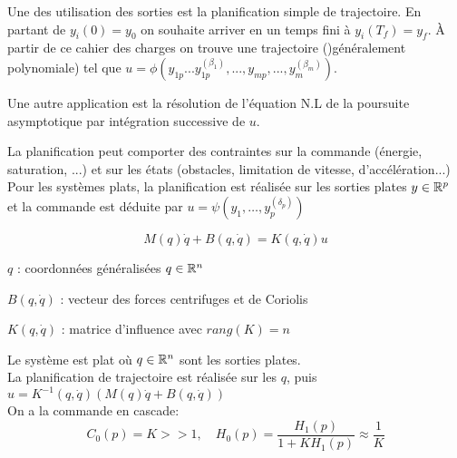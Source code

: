 \documentclass[main.tex]{subfiles}
\begin{document}
Une des utilisation des sorties est la planification simple de trajectoire. En partant de $y_i(0) = y_0 $ on souhaite arriver en un temps fini  à $y_i(T_f) = y_f$. À partir de ce cahier des charges on trouve une trajectoire ()généralement polynomiale) tel que $u = \phi(y_{1p} ... y_{1p}^{(\beta_1)},...,y_{mp},...,y_{m}^{(\beta_m)})$.

Une autre application est la résolution de l'équation N.L de la poursuite asymptotique par intégration successive de $u$.



\begin{thm}
La planification peut comporter des contraintes sur la commande (énergie, saturation, ...) et sur les états (obstacles, limitation de vitesse, d'accélération...)
Pour les systèmes plats, la planification est réalisée sur les sorties plates $y\in\mathbb{R}^p$ et la commande est déduite par $u=\psi(y_1,\dots,y_p^{(\delta_p)})$
\end{thm}

\begin{exemple}
\[ M(q) \dot{q} + B(q,\dot{q}) = K(q,\dot{q}) u\]

$q$ : coordonnées généralisées $q\in\mathbb{R}^n$

$B(q,\dot{q})$ : vecteur des forces centrifuges et de Coriolis

$K(q,\dot{q})$ : matrice d'influence avec $rang(K)=n$

Le système est plat où $q\in\mathbb{R}^n$ sont les sorties plates.\\

La planification de trajectoire est réalisée sur les $q$, puis $u=K^{-1}(q,\dot{q})(M(q)\dot{q} + B(q,\dot{q}))$\\

On a la commande en cascade:
\[ C_0(p) = K >>1, \quad H_0(p) = \frac{H_1(p)}{1+KH_1(p)} \approx \frac{1}{K} \]
\end{exemple}
\end{document}
